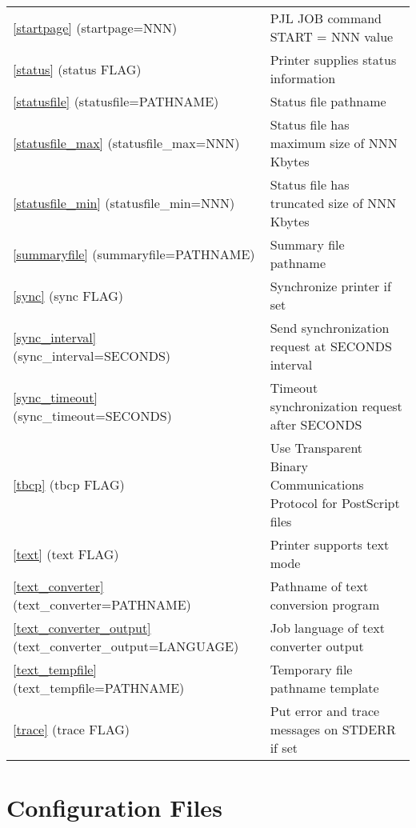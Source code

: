 \documentclass[a4paper]{article}
\begin{document}
\begin{table}[tbp]
\begin{center}
\begin{tabular}{ll}
{\ttfamily \ref{startpage} {(startpage=NNN)}}&  PJL JOB command START = NNN value\\ 
{\ttfamily \ref{status} {(status FLAG)}}&  Printer supplies status information\\ 
{\ttfamily \ref{statusfile} {(statusfile=PATHNAME)}}&  Status file pathname\\ 
{\ttfamily \ref{statusfile_max} {(statusfile\_max=NNN)}}&  Status file has maximum size of NNN Kbytes\\ 
{\ttfamily \ref{statusfile_min} {(statusfile\_min=NNN)}}&  Status file has truncated size of NNN Kbytes\\ 
{\ttfamily \ref{summaryfile} {(summaryfile=PATHNAME)}}&  Summary file pathname\\ 
{\ttfamily \ref{sync} {(sync FLAG)}}&  Synchronize printer if set\\ 
{\ttfamily \ref{sync_interval} {(sync\_interval=SECONDS)}}&  Send synchronization request at SECONDS interval\\ 
{\ttfamily \ref{sync_timeout} {(sync\_timeout=SECONDS)}}&  Timeout synchronization request after SECONDS\\ 
{\ttfamily \ref{tbcp} {(tbcp FLAG)}}&  Use Transparent Binary Communications Protocol for PostScript files\\ 
{\ttfamily \ref{text} {(text FLAG)}}&  Printer supports text mode\\ 
{\ttfamily \ref{text_converter} {(text\_converter=PATHNAME)}}&  Pathname of text conversion program\\ 
{\ttfamily \ref{text_converter_output} {(text\_converter\_output=LANGUAGE)}}&  Job language of text converter output\\ 
{\ttfamily \ref{text_tempfile} {(text\_tempfile=PATHNAME)}}&  Temporary file pathname template\\ 
{\ttfamily \ref{trace} {(trace FLAG)}}&  Put error and trace messages on STDERR if set\\ 
\end{tabular}
\end{center}
\end{table}



\section{Configuration Files
\label{configfiles}}
\end{document}
